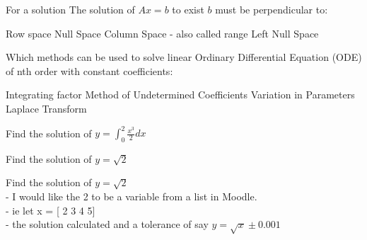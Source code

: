 \documentclass{exam}
\begin{document}
\begin{questions}


\question
For a solution The solution of $Ax=b$ to exist $b$ must be perpendicular to:
\begin{choices}
    \choice Row space
    \choice Null Space
    \choice Column Space - also called range
    \CorrectChoice Left Null Space
\end{choices}

\question
Which methods can be used to solve linear Ordinary Differential Equation (ODE) of nth order with constant coefficients:
\begin{choices}
    \choice Integrating factor
    \CorrectChoice Method of Undetermined Coefficients
    \CorrectChoice Variation in Parameters
    \CorrectChoice Laplace Transform
\end{choices}

\question Find the solution of $y=\int_0^2 \frac{x^3}{2} dx$


\question Find the solution of $y=\sqrt{2}$



\question Find the solution of $y=\sqrt{2}$\\
- I would like the 2 to be a variable from a list in Moodle.\\
- ie let x = [ 2 3 4 5]\\
- the solution calculated and a tolerance of say $y = \sqrt{x} \pm 0.001$


\end{questions}
\end{document}
